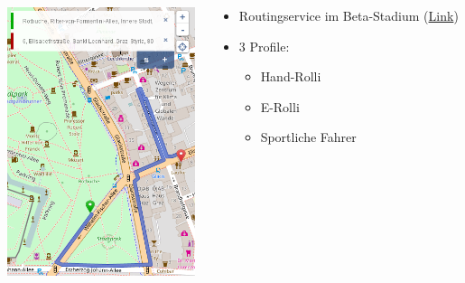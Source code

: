 \documentclass{beamer}
\begin{document}
\begin{frame}{}

  \begin{columns}[c]
    \begin{column}[T]{.6\textwidth}
      \begin{center}
      \vspace{-1cm}
      \includegraphics[width=5.5cm]{routing1_normal.png}
      \end{center}
    \end{column}
    \begin{column}[T]{.4\textwidth}
      \begin{itemize}
      \vspace{1cm}
        \item Routingservice im Beta-Stadium (\href{http://mm.linuxtage.at/osm/routing/wheelchair-normal/?z=17\&center=47.072643\%2C15.452845\&loc=47.073045\%2C15.446059\&loc=47.073841\%2C15.448145\&hl=en\&ly=\&alt=\&df=\&srv=}{Link})
              \pause
      \vspace{1cm}
            \item 3 Profile:
              \begin{itemize}
                \item Hand-Rolli
                \item E-Rolli
                \item Sportliche Fahrer
          \end{itemize}
        \end{itemize}

    \end{column}
  \end{columns}

\end{frame}
\end{document}
